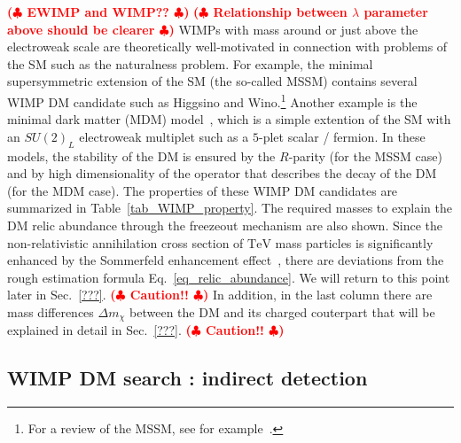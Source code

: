 \documentclass[12pt,twoside,book]{article}
\def\rem#1{ {\bf\textcolor{red}{($\clubsuit$ #1 $\clubsuit$)}}}
\begin{document}
\rem{EWIMP and WIMP??}
\rem{Relationship between $\lambda$ parameter above should be clearer}
WIMPs with mass around or just above the electroweak scale are
theoretically well-motivated in connection with problems of the SM such
as the naturalness problem.  For example, the minimal supersymmetric
extension of the SM (the so-called MSSM) contains several WIMP DM
candidate such as Higgsino and Wino.\footnote{
For a review of the MSSM, see for example~\cite{Martin:1997ns}.
}
Another example is the minimal dark matter (MDM)
model~\cite{Cirelli:2005uq, Cirelli:2007xd, Cirelli:2009uv}, which is a
simple extention of the SM with an $SU(2)_L$ electroweak multiplet such
as a $5$-plet scalar / fermion.  In these models, the stability of the
DM is ensured by the $R$-parity (for the MSSM case) and by high
dimensionality of the operator that describes the decay of the DM (for
the MDM case).  The properties of these WIMP DM candidates are
summarized in Table~\ref{tab_WIMP_property}.  The required masses to
explain the DM relic abundance through the freezeout mechanism are also
shown.  Since the non-relativistic annihilation cross section of
$\mathrm{TeV}$ mass particles is significantly enhanced by the
Sommerfeld enhancement effect~\cite{Hisano:2004ds, Hisano:2006nn}, there
are deviations from the rough estimation formula
Eq.~\eqref{eq_relic_abundance}.  We will return to this point later in
Sec.~\ref{???}.  \rem{Caution!!}  In addition, in the last column there
are mass differences $\Delta m_\chi$ between the DM and its charged
couterpart that will be explained in detail in Sec.~\ref{???}.
\rem{Caution!!}

\subsection{WIMP DM search : indirect detection}

\begin{appendices}
 
\end{appendices}

\clearpage



\end{document}
